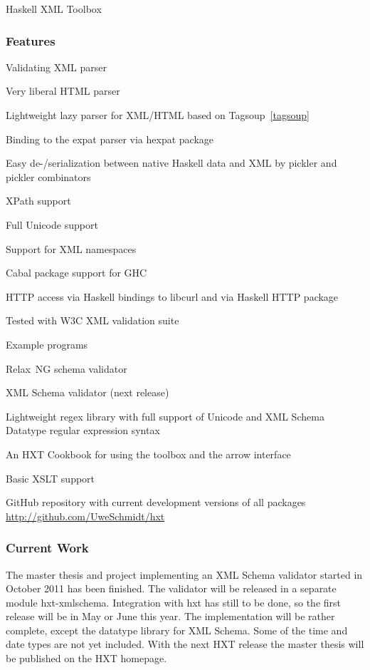 \begin{hcarentry}[updated]{Haskell XML Toolbox}
\subsubsection*{Features}

\begin{compactitem}
\item Validating XML parser
\item Very liberal HTML parser
\item Lightweight lazy parser for XML/HTML based on Tagsoup~\cref{tagsoup}
\item Binding to the expat parser via hexpat package
\item Easy de-/serialization between native Haskell data and XML by pickler and pickler combinators
\item XPath support
\item Full Unicode support
\item Support for XML namespaces
\item Cabal package support for GHC
\item HTTP access via Haskell bindings to libcurl and via Haskell HTTP
  package
\item Tested with W3C XML validation suite
\item Example programs
\item Relax~NG schema validator
\item XML Schema validator (next release)
\item Lightweight regex library with full support of Unicode and XML Schema
  Datatype regular expression syntax
\item An HXT Cookbook for using the toolbox and the arrow interface
\item Basic XSLT support
\item GitHub repository with current development versions of all packages
  \url{http://github.com/UweSchmidt/hxt}
\end{compactitem}

\subsubsection*{Current Work}

The master thesis and project implementing an XML Schema validator
started in October 2011 has been finished. The validator will be released
in a separate module hxt-xmlschema. Integration with hxt has still to be done,
so the first release will be in May or June this year.
The implementation will be rather complete, except the datatype library
for XML Schema. Some of the time and date types are not yet included.
With the next HXT release the master thesis will be published on the HXT homepage.


\end{hcarentry}
